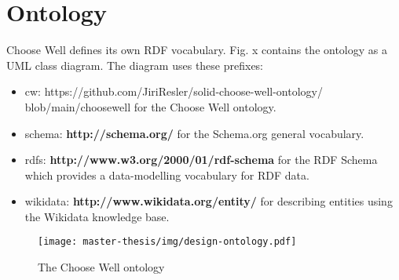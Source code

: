 \section{Ontology}
Choose Well defines its own RDF vocabulary. 
Fig. x contains the ontology as a UML class diagram. 
The diagram uses these prefixes:
\begin{itemize}[noitemsep,nolistsep]
  \item cw: https://github.com/JiriResler/solid-choose-well-ontology/ \newline blob/main/choosewell for the Choose Well ontology.
  \item schema: \textbf{http://schema.org/} for the Schema.org general vocabulary. 
  \item rdfs: \textbf{http://www.w3.org/2000/01/rdf-schema} for the RDF Schema which provides a data-modelling vocabulary for RDF data.
  \item wikidata: \textbf{http://www.wikidata.org/entity/} for describing entities using the Wikidata knowledge base.
\end{itemize}

\begin{figure}[h]
  \centering
  \texttt{[image: master-thesis/img/design-ontology.pdf]}
  \caption{The Choose Well ontology}
\end{figure}
